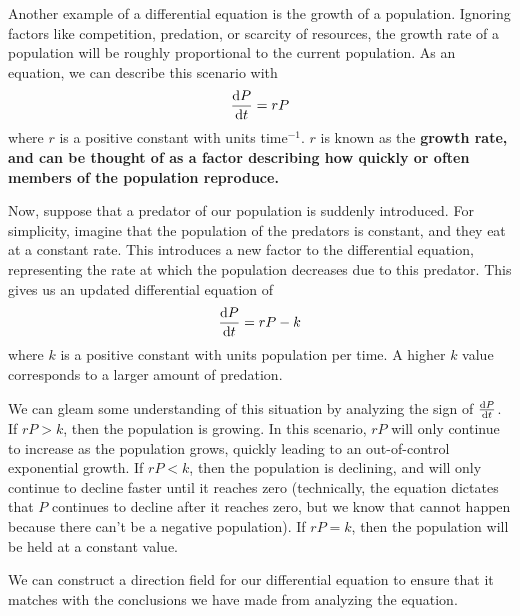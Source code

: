 \begin{example}
    
Another example of a differential equation is the growth of a population. Ignoring factors like competition, predation, or scarcity of resources, the growth rate of a population will be roughly proportional to the current population. As an equation, we can describe this scenario with
\[ \dv{P}{t} = rP \]
where $r$ is a positive constant with units time$^{-1}$. $r$ is known as the \bf{growth rate}, and can be thought of as a factor describing how quickly or often members of the population reproduce. \par
Now, suppose that a predator of our population is suddenly introduced. For simplicity, imagine that the population of the predators is constant, and they eat at a constant rate. This introduces a new factor to the differential equation, representing the rate at which the population decreases due to this predator. This gives us an updated differential equation of
\[ \dv{P}{t} = rP - k\]
where $k$ is a positive constant with units population per time. A higher $k$ value corresponds to a larger amount of predation. \par
We can gleam some understanding of this situation by analyzing the sign of $\dv{P}{t}$. If $rP > k$, then the population is growing. In this scenario, $rP$ will only continue to increase as the population grows, quickly leading to an out-of-control exponential growth. If $rP < k$, then the population is declining, and will only continue to decline faster until it reaches zero (technically, the equation dictates that $P$ continues to decline after it reaches zero, but we know that cannot happen because there can't be a negative population). If $rP = k$, then the population will be held at a constant value. \par
We can construct a direction field for our differential equation to ensure that it matches with the conclusions we have made from analyzing the equation. \par
\begin{figure}[h!]
    \centering
\end{figure}
\end{example}
